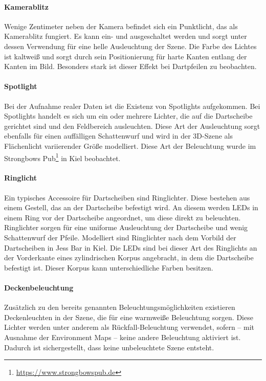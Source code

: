 \paragraph{Kamerablitz}

Wenige Zentimeter neben der Kamera befindet sich ein Punktlicht, das als Kamerablitz fungiert. Es kann ein- und ausgeschaltet werden und sorgt unter dessen Verwendung für eine helle Ausleuchtung der Szene. Die Farbe des Lichtes ist kaltweiß und sorgt durch sein Positionierung für harte Kanten entlang der Kanten im Bild. Besonders stark ist dieser Effekt bei Dartpfeilen zu beobachten.

\paragraph{Spotlight}

Bei der Aufnahme realer Daten ist die Existenz von Spotlights aufgekommen. Bei Spotlights handelt es sich um ein oder mehrere Lichter, die auf die Dartscheibe gerichtet sind und den Feldbereich ausleuchten. Diese Art der Ausleuchtung sorgt ebenfalls für einen auffälligen Schattenwurf und wird in der 3D-Szene als Flächenlicht variierender Größe modelliert. Diese Art der Beleuchtung wurde im Strongbows Pub\footnote{\url{https://www.strongbowspub.de}} in Kiel beobachtet.

\paragraph{Ringlicht}

Ein typisches Accessoire für Dartscheiben sind Ringlichter. Diese bestehen aus einem Gestell, das an der Dartscheibe befestigt wird. An diesem werden LEDs in einem Ring vor der Dartscheibe angeordnet, um diese direkt zu beleuchten. Ringlichter sorgen für eine uniforme Ausleuchtung der Dartscheibe und wenig Schattenwurf der Pfeile. Modelliert sind Ringlichter nach dem Vorbild der Dartscheiben in Jess Bar in Kiel. Die LEDs sind bei dieser Art des Ringlichts an der Vorderkante eines zylindrischen Korpus angebracht, in dem die Dartscheibe befestigt ist. Dieser Korpus kann unterschiedliche Farben besitzen.

\paragraph{Deckenbeleuchtung}

Zusätzlich zu den bereits genannten Beleuchtungsmöglichkeiten existieren Deckenleuchten in der Szene, die für eine warmweiße Beleuchtung sorgen. Diese Lichter werden unter anderem als Rückfall-Beleuchtung verwendet, sofern -- mit Ausnahme der Environment Maps -- keine andere Beleuchtung aktiviert ist. Dadurch ist sichergestellt, dass keine unbeleuchtete Szene entsteht.

